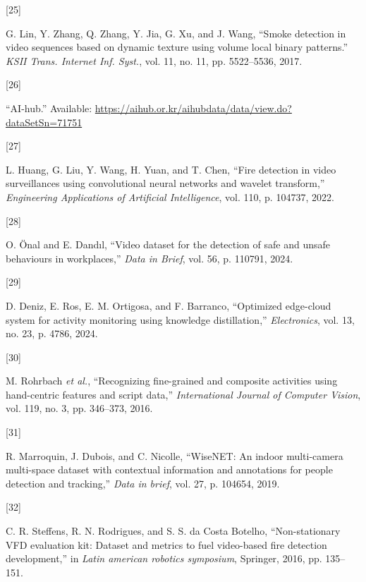 \documentclass[
  10pt,
]{article}
\newlength{\cslhangindent}
\newlength{\csllabelwidth}
\newenvironment{CSLReferences}[2] %
 {\begin{list}{}{%
  \setlength{\itemindent}{0pt}
  \setlength{\leftmargin}{0pt}
  \setlength{\parsep}{0pt}
  \ifodd #1
   \setlength{\leftmargin}{\cslhangindent}
   \setlength{\itemindent}{-1\cslhangindent}
  \fi
  \setlength{\itemsep}{#2\baselineskip}}}
 {\end{list}}
\newcommand{\CSLLeftMargin}[1]{\parbox[t]{\csllabelwidth}{\strut#1\strut}}
\newcommand{\CSLRightInline}[1]{\parbox[t]{\linewidth - \csllabelwidth}{\strut#1\strut}}
\begin{document}
\begin{CSLReferences}{0}{0}
\CSLLeftMargin{{[}25{]} }%
\CSLRightInline{G. Lin, Y. Zhang, Q. Zhang, Y. Jia, G. Xu, and J. Wang,
{``Smoke detection in video sequences based on dynamic texture using
volume local binary patterns.''} \emph{KSII Trans. Internet Inf. Syst.},
vol. 11, no. 11, pp. 5522--5536, 2017.}

\CSLLeftMargin{{[}26{]} }%
\CSLRightInline{{``AI-hub.''} Available:
\url{https://aihub.or.kr/aihubdata/data/view.do?dataSetSn=71751}}

\CSLLeftMargin{{[}27{]} }%
\CSLRightInline{L. Huang, G. Liu, Y. Wang, H. Yuan, and T. Chen, {``Fire
detection in video surveillances using convolutional neural networks and
wavelet transform,''} \emph{Engineering Applications of Artificial
Intelligence}, vol. 110, p. 104737, 2022.}

\CSLLeftMargin{{[}28{]} }%
\CSLRightInline{O. Önal and E. Dandıl, {``Video dataset for the
detection of safe and unsafe behaviours in workplaces,''} \emph{Data in
Brief}, vol. 56, p. 110791, 2024.}

\CSLLeftMargin{{[}29{]} }%
\CSLRightInline{D. Deniz, E. Ros, E. M. Ortigosa, and F. Barranco,
{``Optimized edge-cloud system for activity monitoring using knowledge
distillation,''} \emph{Electronics}, vol. 13, no. 23, p. 4786, 2024.}

\CSLLeftMargin{{[}30{]} }%
\CSLRightInline{M. Rohrbach \emph{et al.}, {``Recognizing fine-grained
and composite activities using hand-centric features and script data,''}
\emph{International Journal of Computer Vision}, vol. 119, no. 3, pp.
346--373, 2016.}

\CSLLeftMargin{{[}31{]} }%
\CSLRightInline{R. Marroquin, J. Dubois, and C. Nicolle, {``WiseNET: An
indoor multi-camera multi-space dataset with contextual information and
annotations for people detection and tracking,''} \emph{Data in brief},
vol. 27, p. 104654, 2019.}

\CSLLeftMargin{{[}32{]} }%
\CSLRightInline{C. R. Steffens, R. N. Rodrigues, and S. S. da Costa
Botelho, {``Non-stationary VFD evaluation kit: Dataset and metrics to
fuel video-based fire detection development,''} in \emph{Latin american
robotics symposium}, Springer, 2016, pp. 135--151.}


\end{CSLReferences}
\end{document}
